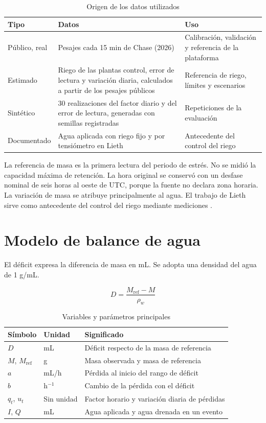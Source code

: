 \documentclass[12pt]{article}
\begin{document}
\begin{table}[H]
\centering
\caption{Origen de los datos utilizados}
\small
\begin{tabularx}{\textwidth}{|l|X|X|}
\hline
Tipo & Datos & Uso \\
\hline
Público, real & Pesajes cada 15 min de Chase (2026) \cite{chase} & Calibración, validación y referencia de la plataforma \\
\hline
Estimado & Riego de las plantas control, error de lectura y variación diaria, calculados a partir de los pesajes públicos & Referencia de riego, límites y escenarios \\
\hline
Sintético & 30 realizaciones del factor diario y del error de lectura, generadas con semillas registradas & Repeticiones de la evaluación \\
\hline
Documentado & Agua aplicada con riego fijo y por tensiómetro en Lieth \cite{lieth} & Antecedente del control del riego \\
\hline
\end{tabularx}
\end{table}

La referencia de masa es la primera lectura del periodo de estrés. No se midió la capacidad máxima de retención. La hora original se conservó con un desfase nominal de seis horas al oeste de UTC, porque la fuente no declara zona horaria. La variación de masa se atribuye principalmente al agua. El trabajo de Lieth sirve como antecedente del control del riego mediante mediciones \cite{lieth}.

\section{Modelo de balance de agua}

El déficit expresa la diferencia de masa en mL. Se adopta una densidad del agua de 1 g/mL.

\begin{equation*}
D=\frac{M_{\mathrm{ref}}-M}{\rho_w}
\end{equation*}

\begin{table}[H]
\centering
\caption{Variables y parámetros principales}
\begin{tabularx}{\textwidth}{|l|l|X|}
\hline
Símbolo & Unidad & Significado \\
\hline
$D$ & mL & Déficit respecto de la masa de referencia \\
\hline
$M$, $M_{\mathrm{ref}}$ & g & Masa observada y masa de referencia \\
\hline
$a$ & mL/h & Pérdida al inicio del rango de déficit \\
\hline
$b$ & h$^{-1}$ & Cambio de la pérdida con el déficit \\
\hline
$q_t$, $u_t$ & Sin unidad & Factor horario y variación diaria de pérdidas \\
\hline
$I$, $Q$ & mL & Agua aplicada y agua drenada en un evento \\
\hline
\end{tabularx}
\end{table}
\end{document}
